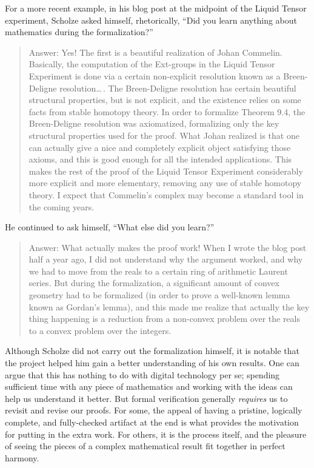\documentclass[12pt]{amsart}
\theoremstyle{definition}
\theoremstyle{remark}
\numberwithin{equation}{section}
\begin{document}
For a more recent example, in his blog post at the midpoint of the Liquid Tensor experiment, Scholze asked himself, rhetorically, ``Did you learn anything about mathematics during the formalization?''
\begin{quote}
  Answer: Yes! The first is a beautiful realization of Johan Commelin. Basically, the computation of the Ext-groups in the Liquid Tensor Experiment is done via a certain non-explicit resolution known as a Breen-Deligne resolution\ldots\,. The Breen-Deligne resolution has certain beautiful structural properties, but is not explicit, and the existence relies on some facts from stable homotopy theory. In order to formalize Theorem 9.4, the Breen-Deligne resolution was axiomatized, formalizing only the key structural properties used for the proof. What Johan realized is that one can actually give a nice and completely explicit object satisfying those axioms, and this is good enough for all the intended applications. This makes the rest of the proof of the Liquid Tensor Experiment considerably more explicit and more elementary, removing any use of stable homotopy theory. I expect that Commelin’s complex may become a standard tool in the coming years.
\end{quote}
He continued to ask himself, ``What else did you learn?''
\begin{quote}
  Answer: What actually makes the proof work! When I wrote the blog post half a year ago, I did not understand why the argument worked, and why we had to move from the reals to a certain ring of arithmetic Laurent series. But during the formalization, a significant amount of convex geometry had to be formalized (in order to prove a well-known lemma known as Gordan’s lemma), and this made me realize that actually the key thing happening is a reduction from a non-convex problem over the reals to a convex problem over the integers.
\end{quote}
Although Scholze did not carry out the formalization himself, it is notable that the project helped him gain a better understanding of his own results. One can argue that this has nothing to do with digital technology per se; spending sufficient time with any piece of mathematics and working with the ideas can help us understand it better. But formal verification generally \emph{requires} us to revisit and revise our proofs. For some,  the appeal of having a pristine, logically complete, and fully-checked artifact at the end is what provides the motivation for putting in the extra work. For others, it is the process itself, and the pleasure of seeing the pieces of a complex mathematical result fit together in perfect harmony.
\end{document}
